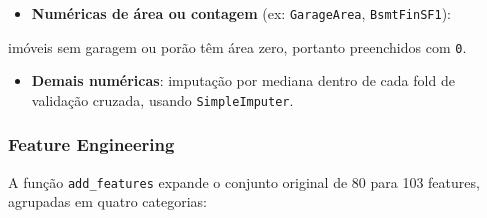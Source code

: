 \documentclass[11pt]{article}
\begin{document}
\begin{itemize}
\item \textbf{Numéricas de área ou contagem} (ex: \texttt{GarageArea}, \texttt{BsmtFinSF1}):
\end{itemize}
imóveis sem garagem ou porão têm área zero, portanto preenchidos com \texttt{0}.

\begin{itemize}
\item \textbf{Demais numéricas}: imputação por mediana dentro de cada fold de validação cruzada, usando \texttt{SimpleImputer}.
\end{itemize}
\subsubsection{Feature Engineering}
\label{sec:orge54c152}
A função \texttt{add\_features} expande o conjunto original de 80 para 103 features, agrupadas em quatro categorias:
\end{document}
